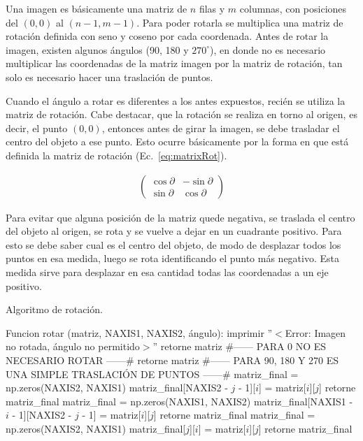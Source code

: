 Una imagen es básicamente una matriz de $n$ filas y $m$ columnas, con
posiciones del $(0,0)$ al $(n-1, m-1)$. Para poder rotarla se
multiplica una matriz de rotación definida con seno y coseno por cada
coordenada. Antes de rotar la imagen, existen algunos ángulos (90, 180
y $270^\circ$), en donde no es necesario multiplicar las coordenadas de la
matriz imagen por la matriz de rotación, tan solo es necesario hacer
una traslación de puntos.  

Cuando el ángulo a rotar es diferentes a los antes expuestos, recién
se utiliza la matriz de rotación. Cabe destacar, que la rotación se
realiza en torno al origen, es decir, el punto $(0,0)$, entonces antes
de girar la imagen, se debe trasladar el centro del objeto a ese
punto. Esto ocurre básicamente por la forma en que está definida la
matriz de rotación (Ec.~\ref{eq:matrixRot}).

\begin{align}
\begin{pmatrix}
  \cos{\partial} & -\sin{\partial} \\
  \sin{\partial} & \cos{\partial}
\end{pmatrix}\label{eq:matrixRot}
\end{align}

Para evitar que alguna posición de la matriz quede negativa, se
traslada el centro del objeto al origen, se rota y se vuelve a dejar
en un cuadrante positivo. Para esto se debe saber cual es el centro
del objeto, de modo de desplazar todos los puntos en esa medida, luego
se rota identificando el punto más negativo. Esta medida sirve para
desplazar en esa cantidad todas las coordenadas a un eje positivo.

\begin{algorithm}
\caption{Algoritmo de rotación.}
\label{alg:rotacion}
\begin{algorithmic}[1]
\STATE Funcion rotar (matriz, NAXIS1, NAXIS2, ángulo):
\STATE imprimir ''$<$Error: Imagen no rotada, ángulo no permitido$>$''
\STATE retorne matriz
\ENDIF
\STATE \#------ PARA 0 NO ES NECESARIO ROTAR ------\#
\STATE retorne matriz
\ENDIF
\STATE \#------ PARA 90, 180 Y 270 ES UNA SIMPLE TRASLACIÓN DE PUNTOS ------\#
\STATE matriz\_final = np.zeros(NAXIS2, NAXIS1)
\STATE matriz\_final[NAXIS2 - $j$ - 1][$i$] = matriz[$i$][$j$]
\ENDWHILE
\ENDWHILE
\STATE retorne matriz\_final
\ENDIF
{}
\STATE matriz\_final = np.zeros(NAXIS1, NAXIS2)
\STATE matriz\_final[NAXIS1 - $i$ - 1][NAXIS2 - $j$ - 1] = matriz[$i$][$j$]
\ENDWHILE
\ENDWHILE
\STATE retorne matriz\_final
\ENDIF
{}
\STATE matriz\_final = np.zeros(NAXIS2, NAXIS1)
\STATE matriz\_final[$j$][$i$] = matriz[$i$][$j$]
\ENDWHILE
\ENDWHILE
\STATE retorne matriz\_final
\ENDIF
\end{algorithmic}
\end{algorithm}

